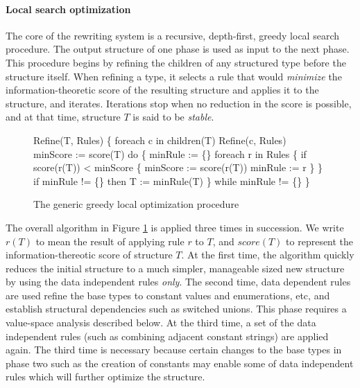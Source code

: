 \paragraph*{Local search optimization}
The core of the rewriting system is 
a recursive, depth-first, greedy local search procedure. The output 
structure of one phase is used as input to the next phase.
This procedure begins by refining the children of any structured type before
the structure itself. When refining a type, it selects a rule that 
would {\em minimize} the information-theoretic score of the resulting
structure and applies it to the structure, and iterates.
Iterations stop when no reduction in the score is possible, and at
that time, structure $T$ is said to be {\em stable}.

\begin{figure}
\begin{code}
Refine(T, Rules)
\{
  foreach c in children(T)
    Refine(c, Rules)
  minScore := score(T)
  do \{
    minRule := \{\}
    foreach r in Rules 
    \{
      if score(r(T)) < minScore
      \{
        minScore := score(r(T))
        minRule := r
      \}
    \}
    if minRule != \{\} then T := minRule(T)
  \} while minRule != \{\}
\}
\end{code}
\caption{The generic greedy local optimization procedure}
\label{fig:refinement}
\end{figure}

The overall algorithm in Figure \ref{fig:refinement} is applied three
times in succession. We write $r(T)$ to mean the result of applying
rule $r$ to $T$, and $score(T)$ to represent the information-thereotic
score of structure $T$.
At the first time, the algorithm quickly reduces the initial structure to 
a much simpler, manageable sized new structure by using
the data independent rules {\em only}. The second time, data dependent
rules are used refine the base types to constant values and enumerations, etc,
and establish structural dependencies such as switched unions. This phase
requires a value-space analysis described below.
At the third time, a set of the data independent rules
(such as combining adjacent constant strings) are applied again. 
The third time is necessary because certain changes
to the base types in phase two such as the creation of constants may 
enable some of data independent rules which will further optimize the structure. 

